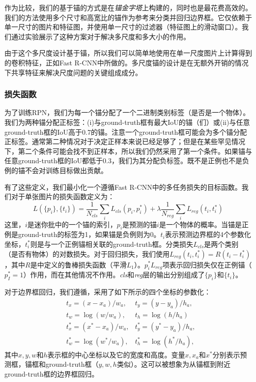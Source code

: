 \documentclass[../main.tex]{subfile}
\begin{document}
作为比较，我们的基于锚的方式是在\textit{锚金字塔}上构建的，同时也是最花费高效的。我们的方法使用多个尺寸和高宽比的锚作为参考来分类并回归边界框。它仅依赖于单一尺寸的图片和特征图，并使用单一尺寸的过滤器（特征图上的滑动窗口）。我们通过实验展示了这种方案对于解决多尺度和多大小的作用。

由于这个多尺度设计基于锚，所以我们可以简单地使用在单一尺度图片上计算得到的卷积特征，正如Fast R-CNN\cite{fastrcnn}中所做的。多尺度锚的设计是在无额外开销的情况下共享特征来解决尺度问题的关键组成成分。

\subsubsection{损失函数}

为了训练RPN，我们为每一个锚分配了一个二进制类别标签（是否是一个物体）。我们为两种锚分配正标签：(i)与ground-truth框有最大IoU的锚（们）或(ii)与任意ground-truth框的IoU高于0.7的锚。注意一个ground-truth框可能会为多个锚分配正标签。通常第二种情况对于决定正样本来说已经足够了；但是在某些罕见情况下，第二个条件可能会找不到正样本，所以我们仍然采用了第一个条件。如果锚与任意ground-truth框的IoU都低于0.3，我们为其分配负标签。既不是正例也不是负例的锚不会对训练目标做出贡献。

有了这些定义，我们最小化一个遵循Fast R-CNN\cite{fastrcnn}中的多任务损失的目标函数。我们对于单张图片的损失函数定义为：
\begin{equation}
    L(\{p_i\}, \{t_i\}) = \frac{1}{N_{cls}}\sum_i L_{cls}(p_i, p_i^*) + \lambda \frac{1}{N_{reg}}\sum_i L_{reg}(t_i, t_i^*)
\end{equation}
这里，$i$是迷你批中的一个锚的索引，$p_i$是预测的锚$i$是一个物体的概率。当锚是正例是ground-truth的标签为1，如果锚是负例则为0。$t_i$表示预测边界框的4个参数化坐标，$t_i^*$则是与一个正例锚相关联的ground-truth框。分类损失$L_{cls}$是两个类别（是否有物体）的对数损失。对于回归损失，我们使用$L_{reg}(t_i, t_i^*)=R(t_i-t_i^*)$，其中$R$是\cite{fastrcnn}中定义的鲁棒损失函数（平滑$L_1$）。$p_i^*L_{reg}$项表示回归损失仅在正例锚（$p_I^*=1$）作用，而在其他情况不作用。\textit{cls}和\textit{reg}层的输出分别组成了$\{p_i\}$和$\{t_i\}$。

对于边界框回归，我们遵循\cite{rcnn}，采用了如下所示的四个坐标的参数化：
\begin{equation}
    \begin{aligned}
         & t_x = (x - x_a) / w_a,     & t_y = (y - y_a) / h_a,     \\
         & t_w = \log(w/w_a),         & t_h = \log(h/h_a)          \\
         & t_x^* = (x^* - x_a) / w_a, & t_y^* = (y^* - y_a) / h_a, \\
         & t_w^* = \log(w^*/w_a),     & t_h^* = \log(h^*/h_a),
    \end{aligned}
\end{equation}
其中$x, y, w$和$h$表示框的中心坐标以及它的宽度和高度。变量$x, x_a$和$x^*$分别表示预测框，锚框和ground-truth框（$y,w,h$类似）。这可以被想象为从锚框到附近ground-truth框的边界框回归。
\end{document}

